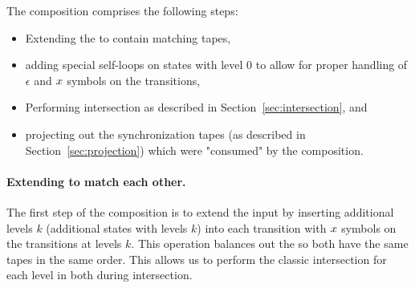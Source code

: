 The composition comprises the following steps:
\begin{itemize}
  \item Extending the \nfts to contain matching tapes,
  \item adding special self-loops on states with level $0$ to allow for proper handling of $\epsilon$ and $x$ symbols on the transitions,
  \item Performing \nft intersection as described in Section~\ref{sec:intersection}, and
  \item projecting out the synchronization tapes (as described in Section~\ref{sec:projection}) which were "consumed" by the composition.
\end{itemize}

\paragraph{Extending \nfts to match each other.}
The first step of the composition is to extend the input \nfts by inserting additional levels $k$ (additional states with levels $k$) into each transition with $x$ symbols on the transitions at levels $k$.
This operation balances out the \nfts so both have the same tapes in the same order.
This allows us to perform the classic \nfa intersection for each level in both \nfts during \nft intersection.

